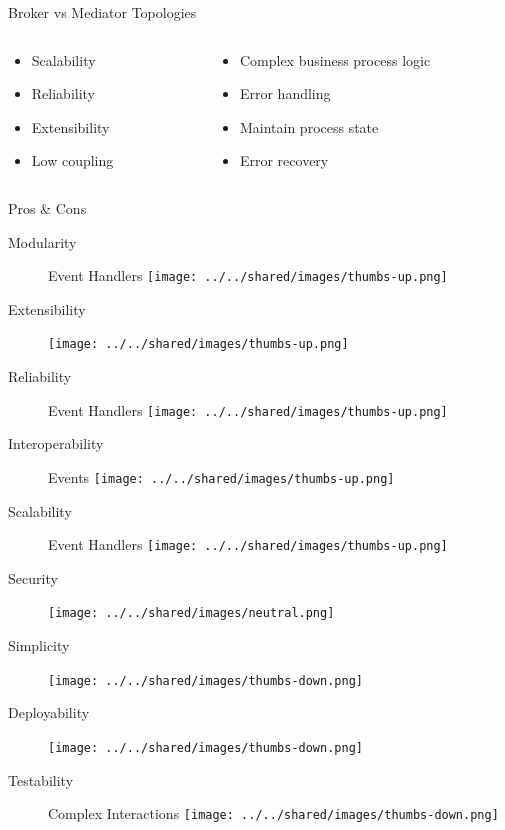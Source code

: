 \documentclass{slide}
\begin{document}
\begin{frame}{Broker vs Mediator Topologies}
    \vspace{1mm}
    \begin{columns}[t]
    \begin{column}{0.41\textwidth}
    {\LARGE
    \begin{itemize}
        \item Scalability
        \item Reliability
        \item Extensibility
        \item Low coupling
    \end{itemize}
    }
    \end{column}
    \begin{column}{0.59\textwidth}
    {\LARGE
    \begin{itemize}
        \item Complex business process logic
        \item Error handling
        \item Maintain process state
        \item Error recovery
    \end{itemize}
    }
    \end{column}
    \end{columns}
\end{frame}


\begin{frame}{Pros \& Cons}
    \vspace{1mm}
    {\LARGE
    \begin{description}
        \item[Modularity] Event Handlers \tabto{15em}\texttt{[image: ../../shared/images/thumbs-up.png]}
        \item[Extensibility] \tabto{15em}\texttt{[image: ../../shared/images/thumbs-up.png]}
        \item[Reliability] Event Handlers \tabto{15em}\texttt{[image: ../../shared/images/thumbs-up.png]}
        \item[Interoperability] Events \tabto{15em}\texttt{[image: ../../shared/images/thumbs-up.png]}
        \item[Scalability] Event Handlers \tabto{15em}\texttt{[image: ../../shared/images/thumbs-up.png]}
        \item[Security] \tabto{15em}\texttt{[image: ../../shared/images/neutral.png]}
        \item[Simplicity] \tabto{15em}\texttt{[image: ../../shared/images/thumbs-down.png]}
        \item[Deployability] \tabto{15em}\texttt{[image: ../../shared/images/thumbs-down.png]}
        \item[Testability] Complex Interactions \tabto{15em}\texttt{[image: ../../shared/images/thumbs-down.png]}
    \end{description}
    }
\end{frame}
\end{document}
